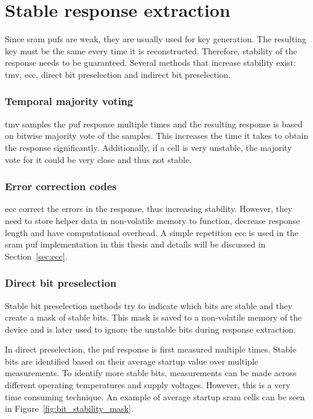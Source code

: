 \section{Stable response extraction}

Since \gls{sram} \glspl{puf} are weak, they are usually used for key generation. The resulting key must be the same every time it is reconstructed. Therefore, stability of the response needs to be guaranteed. Several methods that increase stability exist: \gls{tmv}, \gls{ecc}, direct bit preselection and indirect bit preselection.\cite{Shifman2018}

\subsubsection*{Temporal majority voting}

 \gls{tmv} samples the \gls{puf} response multiple times and the resulting response is based on bitwise majority vote of the samples. This increases the time it takes to obtain the response significantly. Additionally, if a cell is very unstable, the majority vote for it could be very close and thus not stable.

\subsubsection*{Error correction codes}

 \gls{ecc} correct the errors in the response, thus increasing stability. However, they need to store helper data in non-volatile memory to function, decrease response length and have computational overhead. A simple repetition \gls{ecc} is used in the \gls{sram} \gls{puf} implementation in this thesis and details will be discussed in Section~\ref{sec:ecc}.

\subsubsection*{Direct bit preselection}

Stable bit preselection methods try to indicate which bits are stable and they create a mask of stable bits. This mask is saved to a non-volatile memory of the device and is later used to ignore the unstable bits during response extraction.

In direct preselection, the \gls{puf} response is first measured multiple times. Stable bits are identified based on their average startup value over multiple measurements. To identify more stable bits, measurements can be made across different operating temperatures and supply voltages. However, this is a very time consuming technique. An example of average startup \gls{sram} cells can be seen in Figure~\ref{fig:bit_stability_mask}.

